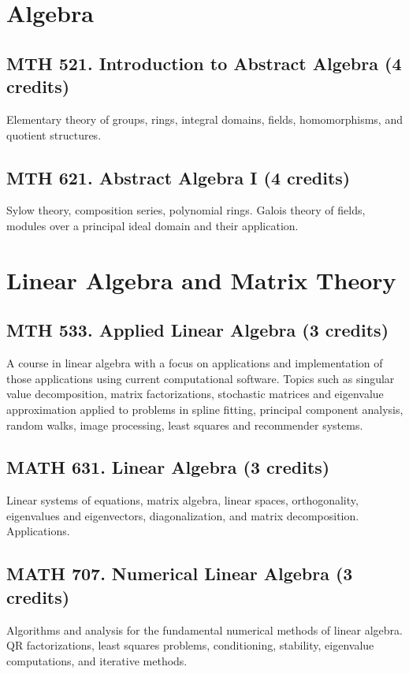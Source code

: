 \documentclass[11pt]{article}
\begin{document}
\section{Algebra}

\subsection{MTH 521. Introduction to Abstract Algebra \mdseries(4 credits)}
Elementary theory of groups, rings, integral domains, fields, homomorphisms, and quotient structures.

\subsection{MTH 621. Abstract Algebra I \mdseries(4 credits)}
Sylow theory, composition series, polynomial rings. Galois theory of fields, modules over a principal ideal domain and their application.

\section{Linear Algebra and Matrix Theory}

\subsection{MTH 533. Applied Linear Algebra \mdseries(3 credits)}
A course in linear algebra with a focus on applications and implementation of those applications using current computational software. Topics such as singular value decomposition, matrix factorizations, stochastic matrices and eigenvalue approximation applied to problems in spline fitting, principal component analysis, random walks, image processing, least squares and recommender systems.

\subsection{MATH 631. Linear Algebra \mdseries(3 credits)}
Linear systems of equations, matrix algebra, linear spaces, orthogonality, eigenvalues and eigenvectors, diagonalization, and matrix decomposition. Applications.

\subsection{MATH 707. Numerical Linear Algebra \mdseries(3 credits)}
Algorithms and analysis for the fundamental numerical methods of linear algebra. QR factorizations, least squares problems, conditioning, stability, eigenvalue computations, and iterative methods.
\end{document}
